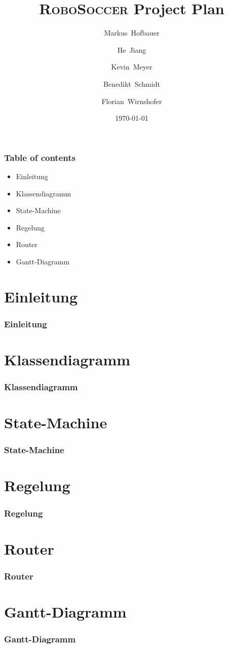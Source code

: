 \documentclass[hyperref={pdfpagelabels=false}]{beamer}
\title{\textsc{RoboSoccer} Project Plan}
\author[Hofbauer, Jiang, Meyer, Schmidt, Wirnshofer]{
  Markus~Hofbauer \and
  He~Jiang \and
  Kevin~Meyer \and
  Benedikt~Schmidt \and
  Florian~Wirnshofer
}
\institute
{
	Technische Universit\"at M\"unchen, Germany
}
\date{\today}
\begin{document}
\begin{frame}
\titlepage
\end{frame} 


\begin{frame}
\frametitle{Table of contents}
	\begin{itemize}
		\item Einleitung
		\item Klassendiagramm
		\item State-Machine
		\item Regelung
		\item Router
		\item Gantt-Diagramm
	\end{itemize}	
\end{frame} 

\section{Einleitung} 
\begin{frame}
	\frametitle{Einleitung} 
\end{frame}

\section{Klassendiagramm} 
\begin{frame}
	\frametitle{Klassendiagramm}
\end{frame}

\section{State-Machine} 
\begin{frame}
	\frametitle{State-Machine} 	
\end{frame}

\section{Regelung} 
\begin{frame}
	\frametitle{Regelung}
\end{frame}

\section{Router} 
\begin{frame}
	\frametitle{Router} 
\end{frame}

\section{Gantt-Diagramm} 
\begin{frame}
	\frametitle{Gantt-Diagramm} 
\end{frame}
\end{document}
